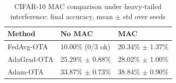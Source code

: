 \begin{table}[!htbp]
    \centering
    \small
    \caption{CIFAR-10 MAC comparison under heavy-tailed interference: final accuracy, mean $\pm$ std over seeds}
    \label{tab:mac-compare}
    \begin{tabular}{l|p{}|p{}}
        \hline
        Method & No MAC & MAC \\
        \hline
        FedAvg-OTA & 10.00\% (0/3 ok) & 20.34\% $\pm$ 1.37\% \\
        AdaGrad-OTA & 25.29\% $\pm$ 0.88\% & 28.02\% $\pm$ 1.00\% \\
        Adam-OTA & 33.87\% $\pm$ 0.73\% & 38.84\% $\pm$ 0.90\% \\
        \hline
    \end{tabular}
\end{table}
